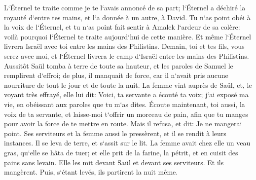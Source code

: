 \verse L`Éternel te traite comme je te l`avais annoncé de sa part; l`Éternel a déchiré la royauté d`entre tes mains, et l`a donnée à un autre, à David. 
\verse Tu n`as point obéi à la voix de l`Éternel, et tu n`as point fait sentir à Amalek l`ardeur de sa colère: voilà pourquoi l`Éternel te traite aujourd`hui de cette manière. 
\verse Et même l`Éternel livrera Israël avec toi entre les mains des Philistins. Demain, toi et tes fils, vous serez avec moi, et l`Éternel livrera le camp d`Israël entre les mains des Philistins. 
\verse Aussitôt Saül tomba à terre de toute sa hauteur, et les paroles de Samuel le remplirent d`effroi; de plus, il manquait de force, car il n`avait pris aucune nourriture de tout le jour et de toute la nuit. 
\verse La femme vint auprès de Saül, et, le voyant très effrayé, elle lui dit: Voici, ta servante a écouté ta voix; j`ai exposé ma vie, en obéissant aux paroles que tu m`as dites. 
\verse Écoute maintenant, toi aussi, la voix de ta servante, et laisse-moi t`offrir un morceau de pain, afin que tu manges pour avoir la force de te mettre en route. 
\verse Mais il refusa, et dit: Je ne mangerai point. Ses serviteurs et la femme aussi le pressèrent, et il se rendit à leurs instances. Il se leva de terre, et s`assit sur le lit. 
\verse La femme avait chez elle un veau gras, qu`elle se hâta de tuer; et elle prit de la farine, la pétrit, et en cuisit des pains sans levain. 
\verse Elle les mit devant Saül et devant ses serviteurs. Et ils mangèrent. Puis, s`étant levés, ils partirent la nuit même. 

\chapter{}

